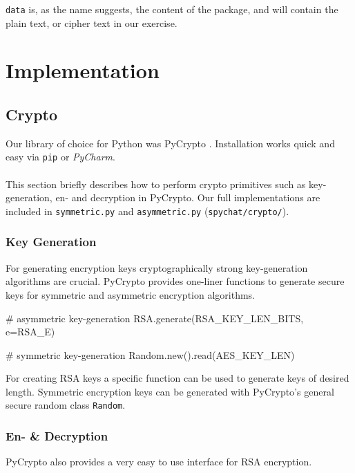 \documentclass[11pt, a4paper]{article}
\begin{document}
\lstinline|data| is, as the name suggests, the content of the package,
and will contain the plain text, or cipher text in our exercise. 

\section{Implementation}

\subsection{Crypto}

Our library of choice for Python was PyCrypto \cite{pycrypto}. Installation works quick and easy via \lstinline|pip| or \textit{PyCharm}.
\\\\
This section briefly describes how to perform crypto primitives such as key-generation, en- and decryption in PyCrypto.
Our full implementations are included in \lstinline|symmetric.py| and \lstinline|asymmetric.py| (\lstinline|spychat/crypto/|).

\subsubsection{Key Generation}

For generating encryption keys cryptographically strong key-generation algorithms are crucial. PyCrypto provides one-liner functions to generate secure keys for symmetric and asymmetric encryption algorithms.

\vspace{5pt}
\begin{python}
# asymmetric key-generation
RSA.generate(RSA_KEY_LEN_BITS, e=RSA_E)

# symmetric key-generation
Random.new().read(AES_KEY_LEN)
\end{python}
\vspace{10pt}

For creating RSA keys a specific function can be used to generate keys of desired length. Symmetric encryption keys can be generated with PyCrypto's general secure random class \lstinline|Random|.

\subsubsection{En- \& Decryption}

PyCrypto also provides a very easy to use interface for RSA encryption.
\end{document}
